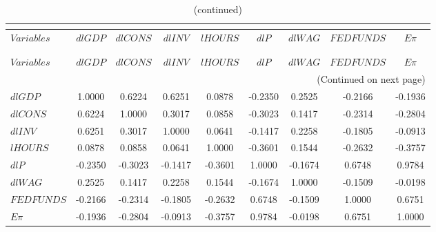  
\begin{center}
\begin{longtable}{lcccccccc} 
\caption{MATRIX OF CORRELATIONS}\\
 \label{Table:th_corr_matrix}\\
\toprule 
$Variables   $	 & 	 $       {dlGDP}$	 & 	 $      {dlCONS}$	 & 	 $       {dlINV}$	 & 	 $      {lHOURS}$	 & 	 $         {dlP}$	 & 	 $       {dlWAG}$	 & 	 $    {FEDFUNDS}$	 & 	 $       {E\pi}$\\
\midrule \endfirsthead 
\caption{(continued)}\\
 \toprule \\ 
$Variables   $	 & 	 $       {dlGDP}$	 & 	 $      {dlCONS}$	 & 	 $       {dlINV}$	 & 	 $      {lHOURS}$	 & 	 $         {dlP}$	 & 	 $       {dlWAG}$	 & 	 $    {FEDFUNDS}$	 & 	 $       {E\pi}$\\
\midrule \endhead 
\midrule \multicolumn{9}{r}{(Continued on next page)} \\ \bottomrule \endfoot 
\bottomrule \endlastfoot 
${dlGDP}     $	 & 	        1.0000	 & 	        0.6224	 & 	        0.6251	 & 	        0.0878	 & 	       -0.2350	 & 	        0.2525	 & 	       -0.2166	 & 	       -0.1936 \\ 
${dlCONS}    $	 & 	        0.6224	 & 	        1.0000	 & 	        0.3017	 & 	        0.0858	 & 	       -0.3023	 & 	        0.1417	 & 	       -0.2314	 & 	       -0.2804 \\ 
${dlINV}     $	 & 	        0.6251	 & 	        0.3017	 & 	        1.0000	 & 	        0.0641	 & 	       -0.1417	 & 	        0.2258	 & 	       -0.1805	 & 	       -0.0913 \\ 
${lHOURS}    $	 & 	        0.0878	 & 	        0.0858	 & 	        0.0641	 & 	        1.0000	 & 	       -0.3601	 & 	        0.1544	 & 	       -0.2632	 & 	       -0.3757 \\ 
${dlP}       $	 & 	       -0.2350	 & 	       -0.3023	 & 	       -0.1417	 & 	       -0.3601	 & 	        1.0000	 & 	       -0.1674	 & 	        0.6748	 & 	        0.9784 \\ 
${dlWAG}     $	 & 	        0.2525	 & 	        0.1417	 & 	        0.2258	 & 	        0.1544	 & 	       -0.1674	 & 	        1.0000	 & 	       -0.1509	 & 	       -0.0198 \\ 
${FEDFUNDS}  $	 & 	       -0.2166	 & 	       -0.2314	 & 	       -0.1805	 & 	       -0.2632	 & 	        0.6748	 & 	       -0.1509	 & 	        1.0000	 & 	        0.6751 \\ 
${E\pi}      $	 & 	       -0.1936	 & 	       -0.2804	 & 	       -0.0913	 & 	       -0.3757	 & 	        0.9784	 & 	       -0.0198	 & 	        0.6751	 & 	        1.0000 \\ 
\end{longtable}
 \end{center}
